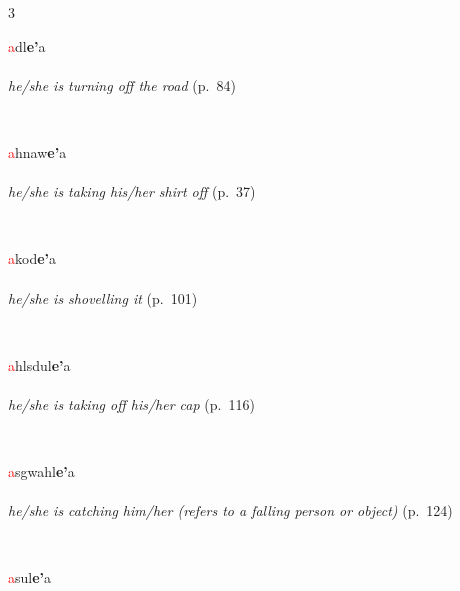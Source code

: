 \documentclass[oneside,openany]{book}%
\begin{document}
\noindent\begin{multicols}{3}%
\begin{minipage}[t]{\linewidth}
\raggedright\noindent \textcolor{Red}{a}dl\textbf{e'}a\\
\\
\noindent \textit{he/she is turning off the road} (p.~84)
\end{minipage}\\[1em]%
\begin{minipage}[t]{\linewidth}
\raggedright\noindent \textcolor{Red}{a}hnaw\textbf{e'}a\\
\\
\noindent \textit{he/she is taking his/her shirt off} (p.~37)
\end{minipage}\\[1em]%
\begin{minipage}[t]{\linewidth}
\raggedright\noindent \textcolor{Red}{a}kod\textbf{e'}a\\
\\
\noindent \textit{he/she is shovelling it} (p.~101)
\end{minipage}\\[1em]%
\begin{minipage}[t]{\linewidth}
\raggedright\noindent \textcolor{Red}{a}hlsdul\textbf{e'}a\\
\\
\noindent \textit{he/she is taking off his/her cap} (p.~116)
\end{minipage}\\[1em]%
\begin{minipage}[t]{\linewidth}
\raggedright\noindent \textcolor{Red}{a}sgwahl\textbf{e'}a\\
\\
\noindent \textit{he/she is catching him/her (refers to a falling person or object)} (p.~124)
\end{minipage}\\[1em]%
\begin{minipage}[t]{\linewidth}
\raggedright\noindent \textcolor{Red}{a}sul\textbf{e'}a\\
\\

\end{minipage}
\end{multicols}
\end{document}
